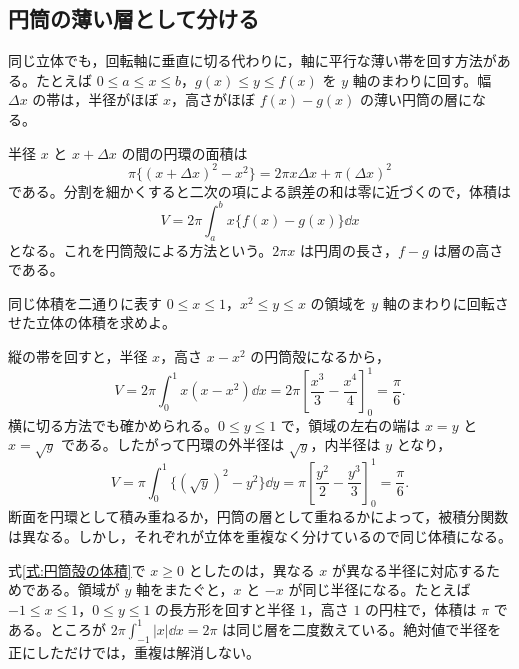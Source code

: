 \subsection{円筒の薄い層として分ける}

同じ立体でも，回転軸に垂直に切る代わりに，軸に平行な薄い帯を回す方法がある。たとえば $0\leq a\leq x\leq b$，$g(x)\leq y\leq f(x)$ を $y$ 軸のまわりに回す。幅 $\Delta x$ の帯は，半径がほぼ $x$，高さがほぼ $f(x)-g(x)$ の薄い円筒の層になる。

半径 $x$ と $x+\Delta x$ の間の円環の面積は
\[
\pi\{(x+\Delta x)^2-x^2\}
 =2\pi x\Delta x+\pi(\Delta x)^2
\]
である。分割を細かくすると二次の項による誤差の和は零に近づくので，体積は
\begin{equation}\label{式:円筒殻の体積}
V=2\pi\int_a^b x\{f(x)-g(x)\}\dd x
\end{equation}
となる。これを円筒殻による方法という。$2\pi x$ は円周の長さ，$f-g$ は層の高さである。

\begin{example}{同じ体積を二通りに表す}
$0\leq x\leq1$，$x^2\leq y\leq x$ の領域を $y$ 軸のまわりに回転させた立体の体積を求めよ。
\end{example}

縦の帯を回すと，半径 $x$，高さ $x-x^2$ の円筒殻になるから，
\[
V=2\pi\int_0^1x(x-x^2)\dd x
 =2\pi\left[\frac{x^3}{3}-\frac{x^4}{4}\right]_0^1
 =\frac{\pi}{6}.
\]
横に切る方法でも確かめられる。$0\leq y\leq1$ で，領域の左右の端は $x=y$ と $x=\sqrt y$ である。したがって円環の外半径は $\sqrt y$，内半径は $y$ となり，
\[
V=\pi\int_0^1\{(\sqrt y)^2-y^2\}\dd y
 =\pi\left[\frac{y^2}{2}-\frac{y^3}{3}\right]_0^1
 =\frac{\pi}{6}.
\]
断面を円環として積み重ねるか，円筒の層として重ねるかによって，被積分関数は異なる。しかし，それぞれが立体を重複なく分けているので同じ体積になる。

式\eqref{式:円筒殻の体積}で $x\geq0$ としたのは，異なる $x$ が異なる半径に対応するためである。領域が $y$ 軸をまたぐと，$x$ と $-x$ が同じ半径になる。たとえば $-1\leq x\leq1$，$0\leq y\leq1$ の長方形を回すと半径 $1$，高さ $1$ の円柱で，体積は $\pi$ である。ところが $2\pi\int_{-1}^1|x|\dd x=2\pi$ は同じ層を二度数えている。絶対値で半径を正にしただけでは，重複は解消しない。

